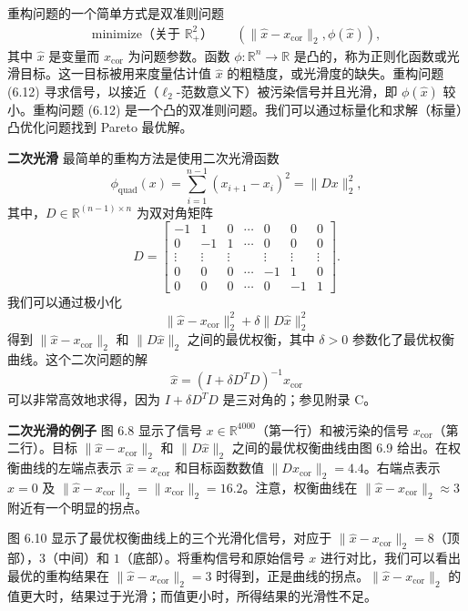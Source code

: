 \documentclass[UTF8, 12pt, fontset=fandol, oneside]{ctexart}
\begin{document}
重构问题的一个简单方式是双准则问题
\begin{equation}
\begin{aligned}
\text{minimize（关于 $\mathbb{R}_+^2$）}\quad & (\|\hat{x}-x_{\mathrm{cor}}\|_2,\phi(\hat{x})),
\end{aligned}
\tag{6.12}
\end{equation}
其中 $\hat{x}$ 是变量而 $x_{\mathrm{cor}}$ 为问题参数。函数 $\phi:\mathbb{R}^n\to\mathbb{R}$ 是凸的，称为正则化函数或光滑目标。这一目标被用来度量估计值 $\hat{x}$ 的粗糙度，或光滑度的缺失。重构问题 (6.12) 寻求信号，以接近（$\ell_2$-范数意义下）被污染信号并且光滑，即 $\phi(\hat{x})$ 较小。重构问题 (6.12) 是一个凸的双准则问题。我们可以通过标量化和求解（标量）凸优化问题找到 Pareto 最优解。

\noindent\textbf{二次光滑}\quad
最简单的重构方法是使用二次光滑函数
\[
\phi_{\mathrm{quad}}(x)=\sum_{i=1}^{n-1}(x_{i+1}-x_i)^2=\|Dx\|_2^2,
\]
其中，$D\in\mathbb{R}^{(n-1)\times n}$ 为双对角矩阵
\[
D=
\begin{bmatrix}
-1 & 1 & 0 & \cdots & 0 & 0 & 0\\
0 & -1 & 1 & \cdots & 0 & 0 & 0\\
\vdots & \vdots & \vdots & & \vdots & \vdots & \vdots\\
0 & 0 & 0 & \cdots & -1 & 1 & 0\\
0 & 0 & 0 & \cdots & 0 & -1 & 1
\end{bmatrix}.
\]
我们可以通过极小化
\[
\|\hat{x}-x_{\mathrm{cor}}\|_2^2+\delta\|D\hat{x}\|_2^2
\]
得到 $\|\hat{x}-x_{\mathrm{cor}}\|_2$ 和 $\|D\hat{x}\|_2$ 之间的最优权衡，其中 $\delta>0$ 参数化了最优权衡曲线。这个二次问题的解
\[
\hat{x}=(I+\delta D^T D)^{-1}x_{\mathrm{cor}}
\]
可以非常高效地求得，因为 $I+\delta D^TD$ 是三对角的；参见附录 C。

\noindent\textbf{二次光滑的例子}\quad
图 6.8 显示了信号 $x\in\mathbb{R}^{4000}$（第一行）和被污染的信号 $x_{\mathrm{cor}}$（第二行）。目标 $\|\hat{x}-x_{\mathrm{cor}}\|_2$ 和 $\|D\hat{x}\|_2$ 之间的最优权衡曲线由图 6.9 给出。在权衡曲线的左端点表示 $\hat{x}=x_{\mathrm{cor}}$ 和目标函数数值 $\|Dx_{\mathrm{cor}}\|_2=4.4$。右端点表示 $\hat{x}=0$ 及 $\|\hat{x}-x_{\mathrm{cor}}\|_2=\|x_{\mathrm{cor}}\|_2=16.2$。注意，权衡曲线在 $\|\hat{x}-x_{\mathrm{cor}}\|_2\approx 3$ 附近有一个明显的拐点。

图 6.10 显示了最优权衡曲线上的三个光滑化信号，对应于 $\|\hat{x}-x_{\mathrm{cor}}\|_2=8$（顶部），$3$（中间）和 $1$（底部）。将重构信号和原始信号 $x$ 进行对比，我们可以看出最优的重构结果在 $\|\hat{x}-x_{\mathrm{cor}}\|_2=3$ 时得到，正是曲线的拐点。$\|\hat{x}-x_{\mathrm{cor}}\|_2$ 的值更大时，结果过于光滑；而值更小时，所得结果的光滑性不足。
\end{document}
